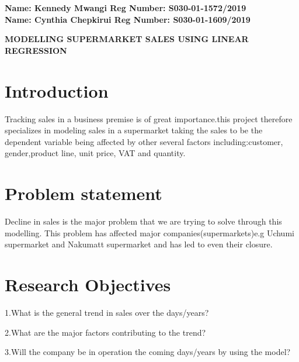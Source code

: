 \documentclass[twoside,a4paper,12pt]{article}
\begin{document}
	
	\begin{center} 
			\large{\bf{Name: Kennedy Mwangi       Reg Number: S030-01-1572/2019\\
					   Name: Cynthia Chepkirui    Reg Number: S030-01-1609/2019\\}} \vspace*{0.75in}
	\end{center}
	
	\begin{center} \Large{ \bf{MODELLING SUPERMARKET SALES USING LINEAR REGRESSION}} \end{center}	


\section*{Introduction} Tracking sales in a business premise is of great importance.this project therefore specializes in modeling sales in a supermarket taking the sales to be the dependent variable being affected by other several factors including:customer, gender,product line, unit price, VAT and quantity.




\section*{Problem statement}Decline in sales is the major problem that we are trying to solve through this modelling. 
This problem has affected major companies(supermarkets)e.g Uchumi supermarket and Nakumatt supermarket and has led to even their closure.

\section*{Research Objectives}  1.What is the general trend in sales over the days/years?

2.What are the major factors contributing to the trend?

3.Will the company be in operation the coming days/years by using the model?

\end{document}
